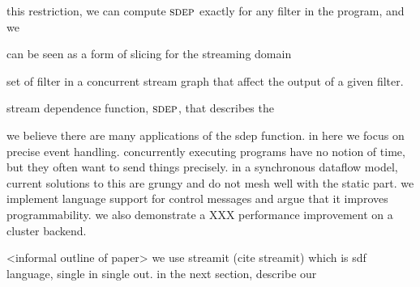  this restriction, we can compute $\textsc{sdep}$ exactly for any
filter in the program, and we

can be seen as a form of slicing for the streaming domain


set of filter in a concurrent stream graph that affect the output of a
given filter.

stream dependence function, $\textsc{sdep}$, that describes the

we believe there are many applications of the sdep function.  in here
we focus on precise event handling.  concurrently executing programs
have no notion of time, but they often want to send things
precisely. in a synchronous dataflow model, current solutions to this
are grungy and do not mesh well with the static part.  we implement
language support for control messages and argue that it improves
programmability.  we also demonstrate a XXX performance improvement on
a cluster backend.

<informal outline of paper>
we use streamit (cite streamit) which is sdf language, single in
single out.  in the next section, describe our 

\cite{streamitcc}
